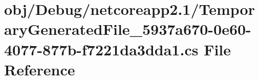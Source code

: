 \hypertarget{netcoreapp2_81_2_temporary_generated_file__5937a670-0e60-4077-877b-f7221da3dda1_8cs}{}\section{obj/\+Debug/netcoreapp2.1/\+Temporary\+Generated\+File\+\_\+5937a670-\/0e60-\/4077-\/877b-\/f7221da3dda1.cs File Reference}
\label{netcoreapp2_81_2_temporary_generated_file__5937a670-0e60-4077-877b-f7221da3dda1_8cs}
